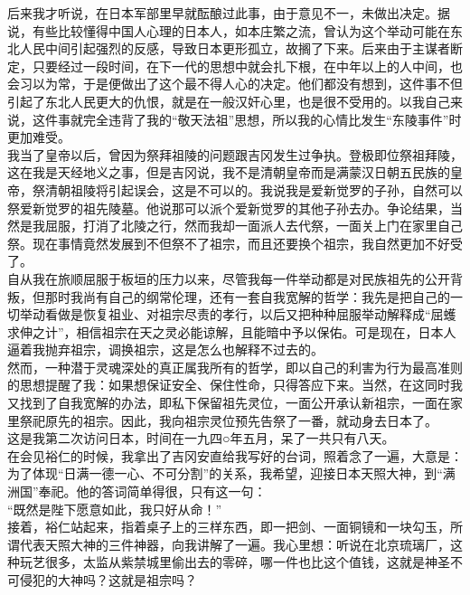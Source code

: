 后来我才听说，在日本军部里早就酝酿过此事，由于意见不一，未做出决定。据说，有些比较懂得中国人心理的日本人，如本庄繁之流，曾认为这个举动可能在东北人民中间引起强烈的反感，导致日本更形孤立，故搁了下来。后来由于主谋者断定，只要经过一段时间，在下一代的思想中就会扎下根，在中年以上的人中间，也会习以为常，于是便做出了这个最不得人心的决定。他们都没有想到，这件事不但引起了东北人民更大的仇恨，就是在一般汉奸心里，也是很不受用的。以我自己来说，这件事就完全违背了我的“敬天法祖”思想，所以我的心情比发生“东陵事件”时更加难受。\\

我当了皇帝以后，曾因为祭拜祖陵的问题跟吉冈发生过争执。登极即位祭祖拜陵，这在我是天经地义之事，但是吉冈说，我不是清朝皇帝而是满蒙汉日朝五民族的皇帝，祭清朝祖陵将引起误会，这是不可以的。我说我是爱新觉罗的子孙，自然可以祭爱新觉罗的祖先陵墓。他说那可以派个爱新觉罗的其他子孙去办。争论结果，当然是我屈服，打消了北陵之行，然而我却一面派人去代祭，一面关上门在家里自己祭。现在事情竟然发展到不但祭不了祖宗，而且还要换个祖宗，我自然更加不好受了。\\

自从我在旅顺屈服于板垣的压力以来，尽管我每一件举动都是对民族祖先的公开背叛，但那时我尚有自己的纲常伦理，还有一套自我宽解的哲学：我先是把自己的一切举动看做是恢复祖业、对祖宗尽责的孝行，以后又把种种屈服举动解释成“屈蠖求伸之计”，相信祖宗在天之灵必能谅解，且能暗中予以保佑。可是现在，日本人逼着我抛弃祖宗，调换祖宗，这是怎么也解释不过去的。\\

然而，一种潜于灵魂深处的真正属我所有的哲学，即以自己的利害为行为最高准则的思想提醒了我：如果想保证安全、保住性命，只得答应下来。当然，在这同时我又找到了自我宽解的办法，即私下保留祖先灵位，一面公开承认新祖宗，一面在家里祭祀原先的祖宗。因此，我向祖宗灵位预先告祭了一番，就动身去日本了。\\

这是我第二次访问日本，时间在一九四○年五月，呆了一共只有八天。\\

在会见裕仁的时候，我拿出了吉冈安直给我写好的台词，照着念了一遍，大意是：为了体现“日满一德一心、不可分割”的关系，我希望，迎接日本天照大神，到“满洲国”奉祀。他的答词简单得很，只有这一句：\\

“既然是陛下愿意如此，我只好从命！”\\

接着，裕仁站起来，指着桌子上的三样东西，即一把剑、一面铜镜和一块勾玉，所谓代表天照大神的三件神器，向我讲解了一遍。我心里想：听说在北京琉璃厂，这种玩艺很多，太监从紫禁城里偷出去的零碎，哪一件也比这个值钱，这就是神圣不可侵犯的大神吗？这就是祖宗吗？\\

